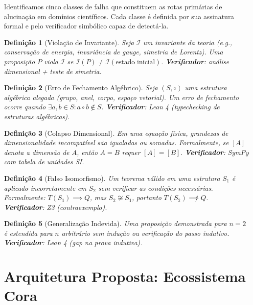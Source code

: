 \documentclass[5p]{elsarticle}
\newtheorem{definition}{Definição}[section]
\theoremstyle{remark}
\begin{document}
Identificamos cinco classes de falha que constituem as rotas primárias de alucinação em domínios científicos. Cada classe é definida por sua assinatura formal e pelo verificador simbólico capaz de detectá-la.

\begin{definition}[Violação de Invariante]
Seja $\mathcal{I}$ um invariante da teoria (e.g., conservação de energia, invariância de gauge, simetria de Lorentz). Uma proposição $P$ viola $\mathcal{I}$ se $\mathcal{I}(P) \neq \mathcal{I}(\text{estado inicial})$. \textbf{Verificador}: análise dimensional + teste de simetria.
\end{definition}

\begin{definition}[Erro de Fechamento Algébrico]
Seja $(S, \circ)$ uma estrutura algébrica alegada (grupo, anel, corpo, espaço vetorial). Um erro de fechamento ocorre quando $\exists a, b \in S : a \circ b \notin S$. \textbf{Verificador}: Lean 4 (typechecking de estruturas algébricas).
\end{definition}

\begin{definition}[Colapso Dimensional]
Em uma equação física, grandezas de dimensionalidade incompatível são igualadas ou somadas. Formalmente, se $[A]$ denota a dimensão de $A$, então $A = B$ requer $[A] = [B]$. \textbf{Verificador}: SymPy com tabela de unidades SI.
\end{definition}

\begin{definition}[Falso Isomorfismo]
Um teorema válido em uma estrutura $S_1$ é aplicado incorretamente em $S_2$ sem verificar as condições necessárias. Formalmente: $T(S_1) \implies Q$, mas $S_2 \not\cong S_1$, portanto $T(S_2) \not\implies Q$. \textbf{Verificador}: Z3 (contraexemplo).
\end{definition}

\begin{definition}[Generalização Indevida]
Uma proposição demonstrada para $n = 2$ é estendida para $n$ arbitrário sem indução ou verificação do passo indutivo. \textbf{Verificador}: Lean 4 (gap na prova indutiva).
\end{definition}

\section{Arquitetura Proposta: Ecossistema Cora}
\end{document}
